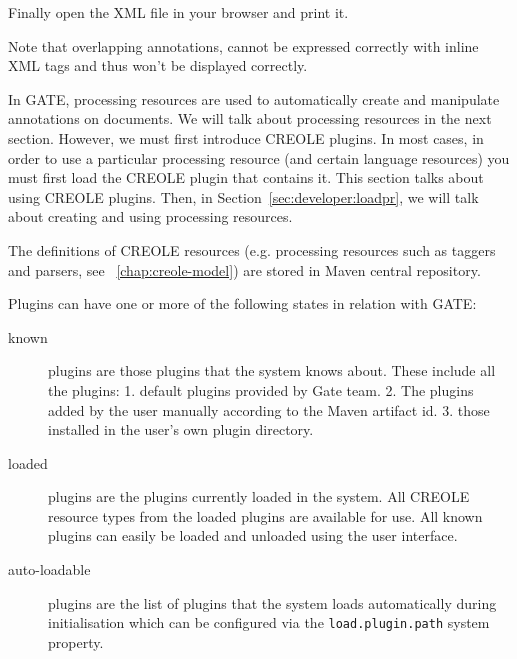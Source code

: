 Finally open the XML file in your browser and print it.

Note that overlapping annotations, cannot be expressed correctly with inline
XML tags and thus won't be displayed correctly.


In GATE, processing resources are used to automatically create and manipulate
annotations on documents. We will talk about processing resources in the next
section. However, we must first introduce CREOLE plugins. In most cases, in order
to use a particular processing resource (and certain language resources) you must
first load the CREOLE plugin that contains it. This section talks about using
CREOLE plugins. Then, in Section~\ref{sec:developer:loadpr}, we will talk about
creating and using processing resources.

The definitions of CREOLE resources (e.g. processing resources such as taggers
and parsers, see \Chapthing\ \ref{chap:creole-model}) are stored in Maven central repository.



Plugins can have one or more of the following states in relation with GATE:
\begin{description}
\item[known] plugins are those plugins that the system knows about. These
include all the plugins: 1. default plugins provided by Gate team. 2. The plugins 
added by the user manually according to the Maven artifact id. 3. those installed in 
the user's own plugin directory.
\item[loaded] plugins are the plugins currently loaded in the system. All CREOLE
resource types from the loaded plugins are available for use. All known plugins
can easily be loaded and unloaded using the user interface.
\item[auto-loadable] plugins are the list of plugins that the system loads
automatically during initialisation which can be configured via the
{\tt load.plugin.path} system property.
\end{description}

